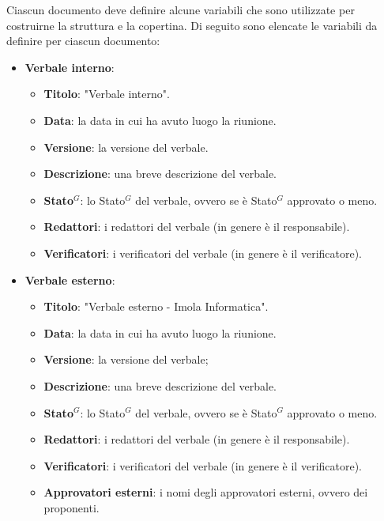 Ciascun documento deve definire alcune variabili che sono utilizzate per
costruirne la struttura e la copertina. Di seguito sono elencate le variabili da
definire per ciascun documento:
\begin{itemize}
	\item \textbf{Verbale interno}:
	      \begin{itemize}
		      \item \textbf{Titolo}: "Verbale interno".
		      \item \textbf{Data}: la data in cui ha avuto luogo la riunione.
		      \item \textbf{Versione}: la versione del verbale.
		      \item \textbf{Descrizione}: una breve descrizione del verbale.
		      \item \textbf{\gls{Stato}$^G$}: lo \gls{Stato}$^G$ del verbale, ovvero se è \gls{Stato}$^G$
		            approvato o meno.
		      \item \textbf{Redattori}: i redattori del verbale (in genere è il
		            responsabile).
		      \item \textbf{Verificatori}: i verificatori del verbale (in genere
		            è il verificatore).
	      \end{itemize}

	\item \textbf{Verbale esterno}:
	      \begin{itemize}
		      \item \textbf{Titolo}: "Verbale esterno - Imola Informatica".
		      \item \textbf{Data}: la data in cui ha avuto luogo la riunione.
		      \item \textbf{Versione}: la versione del verbale;
		      \item \textbf{Descrizione}: una breve descrizione del verbale.
		      \item \textbf{\gls{Stato}$^G$}: lo \gls{Stato}$^G$ del verbale, ovvero se è \gls{Stato}$^G$
		            approvato o meno.
		      \item \textbf{Redattori}: i redattori del verbale (in genere è il
		            responsabile).
		      \item \textbf{Verificatori}: i verificatori del verbale (in genere
		            è il verificatore).
		      \item \textbf{Approvatori esterni}: i nomi degli approvatori
		            esterni, ovvero dei proponenti.
	      \end{itemize}


\end{itemize}
